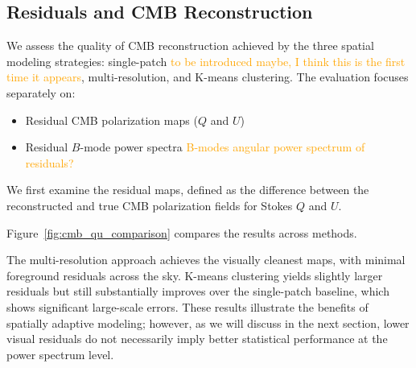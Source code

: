 \documentclass[fleqn,usenatbib]{mnras}
\newcommand{\je}[1]{\textcolor{orange}{#1}}
\begin{document}
\subsection{Residuals and CMB Reconstruction}
\label{sec:residuals_reconstruction}

We assess the quality of CMB reconstruction achieved by the three spatial modeling strategies: single-patch \je{to be introduced maybe, I think this is the first time it appears}, multi-resolution, and K-means clustering.  
The evaluation focuses separately on:
\begin{itemize}
    \item Residual CMB polarization maps (\( Q \) and \( U \))
    \item Residual \( B \)-mode power spectra \je{B-modes angular power spectrum of residuals?}
\end{itemize}

We first examine the residual maps, defined as the difference between the reconstructed and true CMB polarization fields for Stokes \( Q \) and \( U \).

Figure~\ref{fig:cmb_qu_comparison} compares the results across methods.

The multi-resolution approach achieves the visually cleanest maps, with minimal foreground residuals across the sky.  
K-means clustering yields slightly larger residuals but still substantially improves over the single-patch baseline, which shows significant large-scale errors.  
These results illustrate the benefits of spatially adaptive modeling; however, as we will discuss in the next section, lower visual residuals do not necessarily imply better statistical performance at the power spectrum level.
\end{document}
